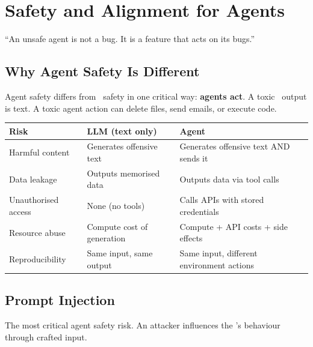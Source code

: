 \chapter{Safety and Alignment for Agents}
\label{ch:safety}

\epigraph{``An unsafe agent is not a bug. It is a feature that acts on its bugs.''}{}


\section{Why Agent Safety Is Different}

Agent safety differs from \llm\ safety in one critical way: \textbf{agents act}. A toxic \llm\ output is text. A toxic agent action can delete files, send emails, or execute code.

\begin{longtable}{p{3.5cm}p{4.5cm}p{4.5cm}}
	\toprule
	\textbf{Risk}       & \textbf{LLM (text only)}   & \textbf{Agent}                            \\
	\midrule
	Harmful content     & Generates offensive text   & Generates offensive text AND sends it     \\
	Data leakage        & Outputs memorised data     & Outputs data via tool calls               \\
	Unauthorised access & None (no tools)            & Calls APIs with stored credentials        \\
	Resource abuse      & Compute cost of generation & Compute + API costs + side effects        \\
	Reproducibility     & Same input, same output    & Same input, different environment actions \\
	\bottomrule
\end{longtable}

\section{Prompt Injection}

The most critical agent safety risk. An attacker influences the \llm's behaviour through crafted input.

